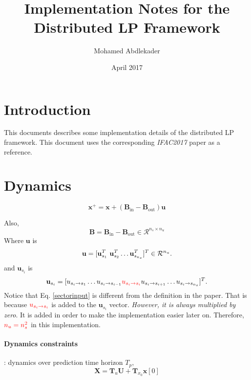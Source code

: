 \documentclass{article}
\title{Implementation Notes for the Distributed LP Framework}
\author{Mohamed Abdlekader}
\date{April 2017}
\begin{document}
 
\begin{titlepage}
\maketitle
\end{titlepage}


\section{Introduction}
This documents describes some implementation details of the distributed LP framework. This document uses the corresponding \textit{IFAC2017} paper as a reference.

\section{Dynamics}

\begin{equation}
\mathbf{x}^+ = \mathbf{x} + ( \mathbf{B}_{\text{in}} - \mathbf{B}_{\text{out}})\mathbf{u}
\end{equation}

Also,
\[
\mathbf{B} = \mathbf{B}_{\text{in}} - \mathbf{B}_{\text{out}} \in \mathcal{R}^{n_s \times n_u}
\]
Where $\mathbf{u}$ is
\begin{equation*}
\mathbf{u} = [\mathbf{u}_{s_1}^T ~\mathbf{u}_{s_2}^T\dots  \mathbf{u}_{s_{n_s}}^T]^T \in {\cal R}^{n_u}. 
\end{equation*}
and $\mathbf{u}_{s_i}$ is
\begin{equation}
\label{sectorinput}
\mathbf{u}_{s_i}= [ u_{s_i \rightarrow s_1} \dots u_{s_i \rightarrow s_{i-1}} {\color{red}u_{s_i \rightarrow s_{i}} } u_{s_i \rightarrow s_{i+1}} \dots\\ u_{s_i \rightarrow s_{n_s}}]^T .
\end{equation}
Notice that Eq. \ref{sectorinput} is different from the definition in the paper. That is because ${\color{red} u_{s_i \rightarrow s_{i}}}$ is added to the $\mathbf{u}_{s_i}$ vector. \textit{However, it is always multiplied by zero}. It is added in order to make the implementation easier later on.
Therefore, ${\color{red}n_u = n_s^2}$ in this implementation.

\paragraph{Dynamics constraints}: dynamics over prediction time horizon $T_p$,
\begin{equation}
\label{dynamicsovertp}
\mathbf{X}= \mathbf{T}_u \mathbf{U} + \mathbf{T}_{x_0}\mathbf{x}[0]
\end{equation}
\end{document}
